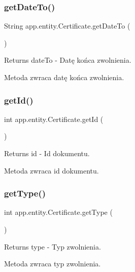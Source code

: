 \subsubsection{\texorpdfstring{getDateTo()}{getDateTo()}}
{\footnotesize\ttfamily String app.\+entity.\+Certificate.\+get\+Date\+To (\begin{DoxyParamCaption}{ }\end{DoxyParamCaption})}

\begin{DoxyReturn}{Returns}
date\+To -\/ Datę końca zwolnienia.
\end{DoxyReturn}
Metoda zwraca datę końca zwolnienia. \mbox{\label{classapp_1_1entity_1_1_certificate_af76963568bb97cad0cc10189ad969c6c}} 
\subsubsection{\texorpdfstring{getId()}{getId()}}
{\footnotesize\ttfamily int app.\+entity.\+Certificate.\+get\+Id (\begin{DoxyParamCaption}{ }\end{DoxyParamCaption})}

\begin{DoxyReturn}{Returns}
id -\/ Id dokumentu.
\end{DoxyReturn}
Metoda zwraca id dokumentu. \mbox{\label{classapp_1_1entity_1_1_certificate_ab4f5de3b6c9d8d4d5548b22b3d4a8ee1}} 
\subsubsection{\texorpdfstring{getType()}{getType()}}
{\footnotesize\ttfamily int app.\+entity.\+Certificate.\+get\+Type (\begin{DoxyParamCaption}{ }\end{DoxyParamCaption})}

\begin{DoxyReturn}{Returns}
type -\/ Typ zwolnienia.
\end{DoxyReturn}
Metoda zwraca typ zwolnienia. \mbox{\label{classapp_1_1entity_1_1_certificate_a65ff6696033329d19248030cfb6112b1}} 
